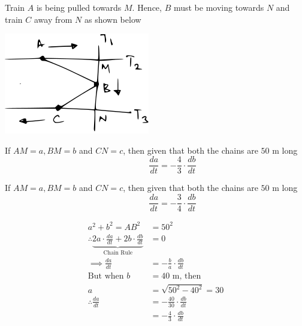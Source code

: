 \documentclass[14pt,fleqn]{extarticle}
\newcommand\dadt{\frac{da}{dt}}
\newcommand\dbdt{\frac{db}{dt}}
\begin{document}
\begin{problem}
\begin{step}
\begin{options}
	
	\end{options}
	\reason
	
      Train $A$ is being pulled towards $M$.
      Hence, $B$  must be moving towards $N$
      and train $C$ away from $N$ as shown below 
      
      \begin{center}
\includegraphics[scale=1.5]{333-B.svg}
\end{center}
      
\end{step}

\begin{step}
  \begin{options} 
     \correct 
       
     If $AM = a, BM = b$ and $CN = c$, then given that both the chains are $50$ m long 
     \[ \qquad\qquad \dadt = -\frac{4}{3}\cdot\dbdt \]  
     \incorrect
     
     If $AM = a, BM = b$ and $CN = c$, then given that both the chains are $50$ m long 
     \[ \qquad\qquad \dadt = -\frac{3}{4}\cdot\dbdt \]  
        
    \end{options} 
     \reason 
       
     \begin{align}
     a^2 + b^2 = AB^2 &= 50^2\\
     \therefore \underbrace{2a\cdot \dadt + 2b\cdot \dbdt}_{\text{Chain Rule}} &= 0 \\
     \implies \dadt &= -\frac{b}{a}\cdot \dbdt \\
     \text{But when }b &= 40\text{ m, then }\\
     a &= \sqrt{50^2 - 40^2} = 30 \\ 
     \therefore \dadt &= -\frac{40}{30}\cdot\dbdt \\
     &= -\frac{4}{3}\cdot\dbdt
\end{align}  
\end{step}

\begin{step}
  \begin{options} 
     \correct 
       

\end{options}
\end{step}
\end{problem}
\end{document}
